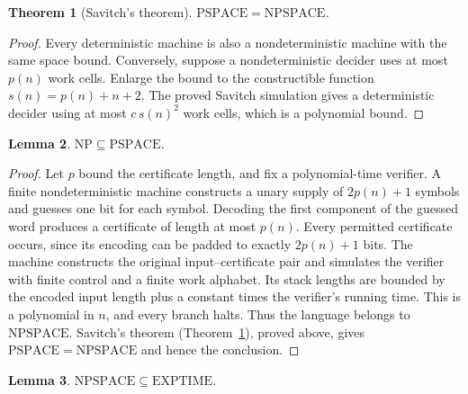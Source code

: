 \documentclass[11pt]{article}
\newtheorem{theorem}{Theorem}
\newtheorem{lemma}[theorem]{Lemma}
\theoremstyle{definition}
\begin{document}
\begin{theorem}[Savitch's theorem]\label{thm:savitch}\leavevmode
$\mathrm{PSPACE}=\mathrm{NPSPACE}$.
\end{theorem}

\begin{proof}\leavevmode
Every deterministic machine is also a nondeterministic machine with the same
space bound. Conversely, suppose a nondeterministic decider uses at most
$p(n)$ work cells. Enlarge the bound to the constructible function
$s(n)=p(n)+n+2$. The proved Savitch simulation gives a deterministic decider
using at most $c\,s(n)^2$ work cells, which is a polynomial bound.
\qedhere
\end{proof}

\begin{lemma}\leavevmode
$\mathrm{NP}\subseteq\mathrm{PSPACE}$.
\end{lemma}

\begin{proof}\leavevmode
Let $p$ bound the certificate length, and fix a polynomial-time verifier.
A finite nondeterministic machine constructs a unary supply of
$2p(n)+1$ symbols and guesses one bit for each symbol. Decoding the first
component of the guessed word produces a certificate of length at most
$p(n)$. Every permitted certificate occurs, since its encoding can be
padded to exactly $2p(n)+1$ bits. The machine constructs the original
input--certificate pair and simulates the verifier with finite control
and a finite work alphabet. Its stack lengths are bounded by the encoded
input length plus a constant times the verifier's running time. This is
a polynomial in $n$, and every branch halts. Thus the language belongs to
$\mathrm{NPSPACE}$. Savitch's theorem (Theorem~\ref{thm:savitch}),
proved above, gives $\mathrm{PSPACE}=\mathrm{NPSPACE}$ and hence the conclusion.
\qedhere
\end{proof}

\begin{lemma}\leavevmode
$\mathrm{NPSPACE}\subseteq\mathrm{EXPTIME}$.
\end{lemma}
\end{document}
